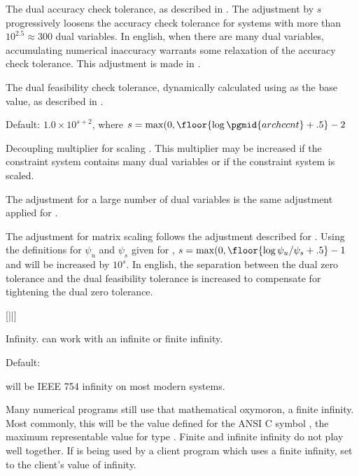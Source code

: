 \begin{codedoc}
  The dual accuracy check tolerance, as described in
  .
  The adjustment by $s$ progressively loosens the accuracy check tolerance
  for systems with more than $10^{2.5} \approx 300$ dual variables.
  In english, when there are many dual variables, accumulating numerical
  inaccuracy warrants some relaxation of the accuracy check tolerance.
  This adjustment is made in .

  \item{}

  The dual feasibility check tolerance, dynamically calculated using
   as the base value, as described in .

  \item{}
    \kw{;}

  Default: $1.0 \times 10^{s+2}$, 
      where $s = \max (0, \floor{\log \pgmid{archccnt} + .5}-2$

  Decoupling multiplier for scaling .
  This multiplier may be increased if the constraint system contains many
  dual variables or if the constraint system is scaled.

  The adjustment for a large number of dual variables is the same
  adjustment applied for .

  The adjustment for matrix scaling follows the adjustment described for
  .
  Using the definitions for $\psi_u$ and $\psi_s$ given for ,
  $s = \max (0, \floor{\log \psi_u/\psi_s + .5}-1$
  and  will be increased by $10^s$.
  In english, the separation between the dual zero tolerance and the dual
  feasibility tolerance is increased to compensate for tightening the
  dual zero tolerance.

  \item{}
   [||] \kw{;}

  Infinity.
  \dylp can work with an infinite or finite infinity.

  Default: 
  
   will be IEEE 754 infinity on most modern systems.

  Many numerical programs still use that mathematical oxymoron, a finite
  infinity.
  Most commonly, this will be the value defined for the ANSI C symbol
  , the maximum representable value for type
  .
  Finite and infinite infinity do not play well together.
  If \dylp is being used by a client program which uses a finite infinity,
  set  to the client's value of infinity.


\end{codedoc}
